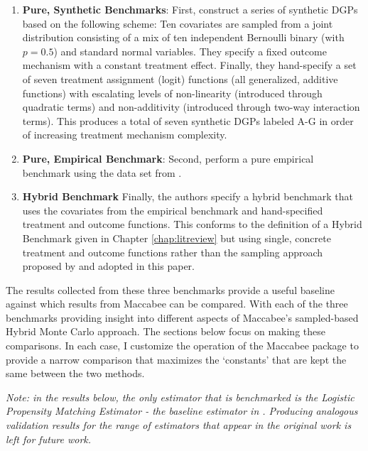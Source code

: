 \documentclass[../main.tex]{subfiles}
\begin{document}
\begin{enumerate}
    \item \textbf{Pure, Synthetic Benchmarks}: First, \citeauthor{Diamond2013GeneticStudies} construct a series of synthetic DGPs based on the following scheme: Ten covariates are sampled from a joint distribution consisting of a mix of ten independent Bernoulli binary (with $p=0.5$) and standard normal variables. They specify a fixed outcome mechanism with a constant treatment effect. Finally, they hand-specify a set of seven treatment assignment (logit) functions (all generalized, additive functions) with escalating levels of non-linearity (introduced through quadratic terms) and non-additivity (introduced through two-way interaction terms). This produces a total of seven synthetic DGPs labeled A-G in order of increasing treatment mechanism complexity.
    
    \item \textbf{Pure, Empirical Benchmark}: Second, \citeauthor{Diamond2013GeneticStudies} perform a pure empirical benchmark using the data set from \textcite{Lalonde1986EvaluatingData}.
    
    \item \textbf{Hybrid Benchmark} Finally, the authors specify a hybrid benchmark that uses the covariates from the \textcite{Lalonde1986EvaluatingData} empirical benchmark and hand-specified treatment and outcome functions. This conforms to the definition of a Hybrid Benchmark given in Chapter \ref{chap:litreview} but using single, concrete treatment and outcome functions rather than the sampling approach proposed by \textcite{Dorie2019Automated1} and adopted in this paper.
\end{enumerate}

The results collected from these three benchmarks provide a useful baseline against which results from Maccabee can be compared. With each of the three benchmarks providing insight into different aspects of Maccabee's sampled-based Hybrid Monte Carlo approach. The sections below focus on making these comparisons. In each case, I customize the operation of the Maccabee package to provide a narrow comparison that maximizes the `constants' that are kept the same between the two methods.

\textit{Note: in the results below, the only estimator that is benchmarked is the Logistic Propensity Matching Estimator - the baseline estimator in \textcite{Diamond2013GeneticStudies}. Producing analogous validation results for the range of estimators that appear in the original work is left for future work.}
\end{document}
